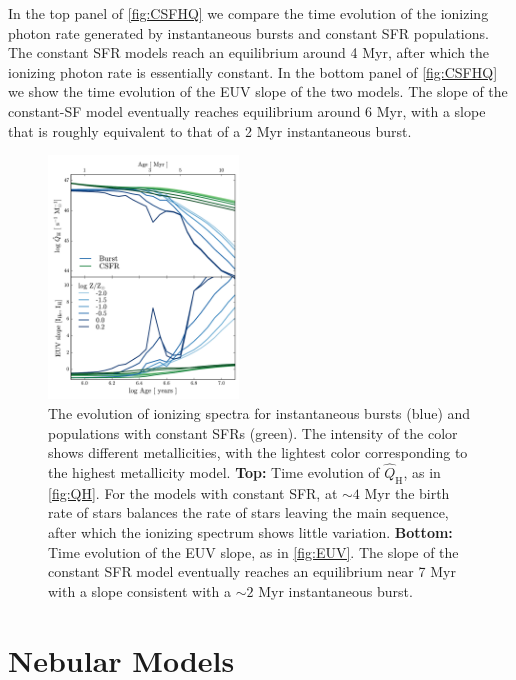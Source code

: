 \documentclass[trackchanges, twocolumn, tighten]{aastex61}
\newcommand{\Fig}[1]{\autoref{fig:#1}}
\newcommand{\QHat}{\ensuremath{\hat{Q}_{\mathrm{H}}}}
\begin{document}
In the top panel of \Fig{CSFHQ} we compare the time evolution of the ionizing photon rate generated by instantaneous bursts and constant SFR populations. The constant SFR models reach an equilibrium around 4 Myr, after which the ionizing photon rate is essentially constant. In the bottom panel of \Fig{CSFHQ} we show the time evolution of the EUV slope of the two models. The slope of the constant-SF model eventually reaches equilibrium around 6 Myr, with a slope that is roughly equivalent to that of a 2 Myr instantaneous burst.

\begin{figure}%
  \begin{centering}
    \includegraphics[width=0.45\textwidth]{f4.pdf}
    \caption{The evolution of ionizing spectra for instantaneous bursts (blue) and populations with constant SFRs (green). The intensity of the color shows different metallicities, with the lightest color corresponding to the highest metallicity model. \textbf{Top: } Time evolution of \QHat{}, as in \Fig{QH}. For the models with constant SFR, at ${\sim}4$ Myr the birth rate of stars balances the rate of stars leaving the main sequence, after which the ionizing spectrum shows little variation. \textbf{Bottom: } Time evolution of the EUV slope, as in \Fig{EUV}. The slope of the constant SFR model eventually reaches an equilibrium near 7 Myr with a slope consistent with a ${\sim}2$ Myr instantaneous burst.}
    \label{fig:CSFHQ}
  \end{centering}
\end{figure}

\section{Nebular Models}\label{sec:models}
\end{document}
